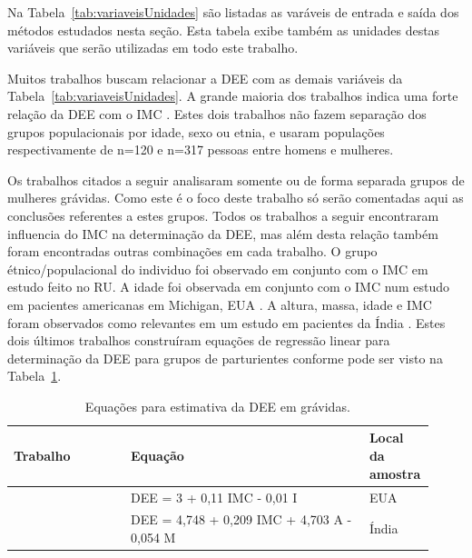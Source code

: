Na Tabela~\ref{tab:variaveisUnidades} são listadas as varáveis de entrada e saída dos métodos estudados nesta seção. Esta tabela exibe também as unidades destas variáveis que serão utilizadas em todo este trabalho.

Muitos trabalhos buscam relacionar a \acrfull{DEE} com as demais variáveis da Tabela~\ref{tab:variaveisUnidades}. A grande maioria dos trabalhos indica uma forte relação da \acrshort{DEE} com o \acrshort{IMC} \cite{Adegboye2017, Galbraith2018}. Estes dois trabalhos não fazem separação dos grupos populacionais por idade, sexo ou etnia, e usaram populações respectivamente de n=120 e n=317 pessoas entre homens e mulheres.

Os trabalhos citados a seguir analisaram somente ou de forma separada grupos de mulheres grávidas. Como este é o foco deste trabalho só serão comentadas aqui as conclusões referentes a estes grupos. Todos os trabalhos a seguir encontraram influencia do \acrshort{IMC} na determinação da \acrshort{DEE}, mas além desta relação também foram encontradas outras combinações em cada trabalho. O grupo étnico/populacional do individuo foi observado em conjunto com o \acrshort{IMC} em \cite{Sharma2011} estudo feito no \acrfull{RU}. A idade foi observada em conjunto com o \acrshort{IMC} num estudo em pacientes americanas em Michigan, EUA \cite{Clinkscales2007}. A altura, massa, idade e \acrshort{IMC} foram observados como relevantes em um estudo em pacientes da Índia \cite{Hazarika2016}. Estes dois últimos trabalhos construíram equações de regressão linear para determinação da \acrshort{DEE} para grupos de parturientes conforme pode ser visto na Tabela~\ref{tab:equacoesEstimativaDEE}.

\begin{table}[!ht]
\begin{center}
\caption{Equações para estimativa da DEE em grávidas.}
\label{tab:equacoesEstimativaDEE}
\begin{tabular}{|p{0.27\linewidth}|p{0.55\linewidth}|p{0.105\linewidth}|}
\hline
\textbf{Trabalho} & \textbf{Equação} & \textbf{Local da amostra}\\
\hline\hline
\cite{Clinkscales2007} & DEE = 3 + 0,11 IMC - 0,01 I & EUA \\
\cite{Hazarika2016} & DEE = 4,748 + 0,209 IMC + 4,703 A - 0,054 M & Índia \\
\hline
\end{tabular}
\end{center}
\end{table}

